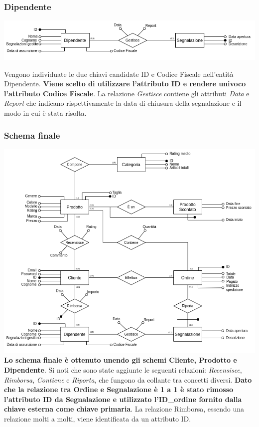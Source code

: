 \subsubsection{Dipendente}
\begin{center}
\includegraphics[scale=0.60]{images/segnalazione.png}
\end{center}
Vengono individuate le due chiavi candidate ID e Codice Fiscale nell'entità Dipendente. \textbf{Viene scelto di utilizzare l'attributo ID e rendere univoco l'attributo Codice Fiscale}. La relazione \textit{Gestisce} contiene gli attributi \textit{Data} e \textit{Report} che indicano rispettivamente la data di chiusura della segnalazione e il modo in cui è stata risolta.
\subsubsection{Schema finale}
\includegraphics[scale=0.55]{images/schema_finale.png}
\textbf{Lo schema finale è ottenuto unendo gli schemi Cliente, Prodotto e Dipendente}. Si noti che sono state aggiunte le seguenti relazioni: \textit{Recensisce}, \textit{Rimborsa}, \textit{Contiene} e \textit{Riporta}, che fungono da collante tra concetti diversi. \textbf{Dato che la relazione tra Ordine e Segnalazione è 1 a 1 è stato rimosso l'attributo ID da Segnalazione e utilizzato l'ID\_ordine fornito dalla chiave esterna come chiave primaria}. La relazione Rimborsa, essendo una relazione molti a molti, viene identificata da un attributo ID.